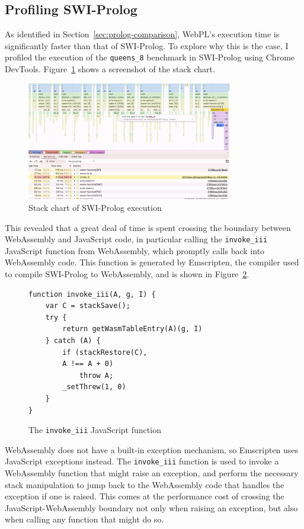 \subsection{Profiling SWI-Prolog}

As identified in Section~\ref{sec:prolog-comparison}, WebPL's execution time is significantly faster than that of SWI-Prolog. To explore why this is the case, I profiled the execution of the \texttt{queens\_8} benchmark in SWI-Prolog using Chrome DevTools. Figure~\ref{fig:swi-prolog-profile} shows a screenshot of the stack chart.

\begin{figure}[H]
\centering
\includegraphics[width=0.8\textwidth]{08evaluation_swiprofiling.png}
\caption{Stack chart of SWI-Prolog execution}
\label{fig:swi-prolog-profile}
\end{figure}

This revealed that a great deal of time is spent crossing the boundary between WebAssembly and JavaScript code, in particular calling the \texttt{invoke\_iii} JavaScript function from WebAssembly, which promptly calls back into WebAssembly code. This function is generated by Emscripten, the compiler used to compile SWI-Prolog to WebAssembly, and is shown in Figure~\ref{fig:invoke-iii}.

\begin{figure}[H]
\centering
\begin{verbatim}
function invoke_iii(A, g, I) {
    var C = stackSave();
    try {
        return getWasmTableEntry(A)(g, I)
    } catch (A) {
        if (stackRestore(C),
        A !== A + 0)
            throw A;
        _setThrew(1, 0)
    }
}
\end{verbatim}
\caption{The \texttt{invoke\_iii} JavaScript function}
\label{fig:invoke-iii}
\end{figure}

WebAssembly does not have a built-in exception mechanism, so Emscripten uses JavaScript exceptions instead. The \texttt{invoke\_iii} function is used to invoke a WebAssembly function that might raise an exception, and perform the necessary stack manipulation to jump back to the WebAssembly code that handles the exception if one is raised. This comes at the performance cost of crossing the JavaScript-WebAssembly boundary not only when raising an exception, but also when calling any function that might do so.


